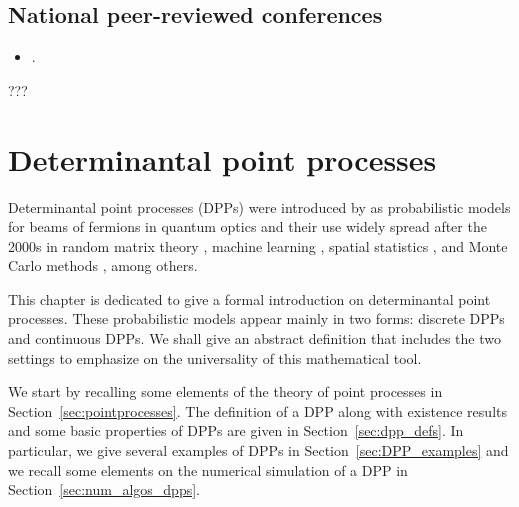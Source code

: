 \documentclass[twoside,11pt]{book}
\numberwithin{theorem}{chapter}
\numberwithin{definition}{chapter}
\numberwithin{proposition}{chapter}
\numberwithin{corollary}{chapter}
\numberwithin{example}{chapter}
\numberwithin{lemma}{chapter}
\numberwithin{assumption}{chapter}
\numberwithin{equation}{chapter}
\numberwithin{figure}{chapter}
\begin{document}
\section*{National peer-reviewed conferences}

\begin{itemize}
\item {}.
\end{itemize}

???




\chapter{Determinantal point processes}\label{chapter:dpp}

Determinantal point processes (DPPs) were introduced by \cite{Mac75} as probabilistic models for beams of fermions in quantum optics and their use widely spread after the 2000s in random matrix theory \parencite{Joh05}, machine learning \parencite{KuTa12}, spatial statistics \parencite{LaMoRu15}, and Monte Carlo methods \parencite{BaHa16}, among others.







This chapter is dedicated to give a formal introduction on determinantal point processes. These probabilistic models appear mainly in two forms: discrete DPPs and continuous DPPs. We shall give an abstract definition that includes the two settings to emphasize on the universality of this mathematical tool.




We start by recalling some elements of the theory of point processes in Section~\ref{sec:pointprocesses}. The definition of a DPP along with existence results and some basic properties of DPPs are given in Section~\ref{sec:dpp_defs}. In particular, we give several examples of DPPs in Section~\ref{sec:DPP_examples} and we recall some elements on the numerical simulation of a DPP in Section~\ref{sec:num_algos_dpps}.
\end{document}
